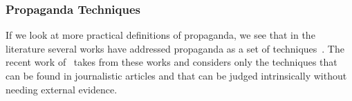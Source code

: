 


\subsubsection{Propaganda Techniques}

If we look at more practical definitions of propaganda, we see that in the literature several works have addressed propaganda as a set of techniques~\citep{torok2015symbiotic,miller1939techniques,weston2018rulebook}. The recent work of~\citet{da2019fine} takes from these works and considers only the techniques that can be found in journalistic articles and that can be judged intrinsically without needing external evidence.

